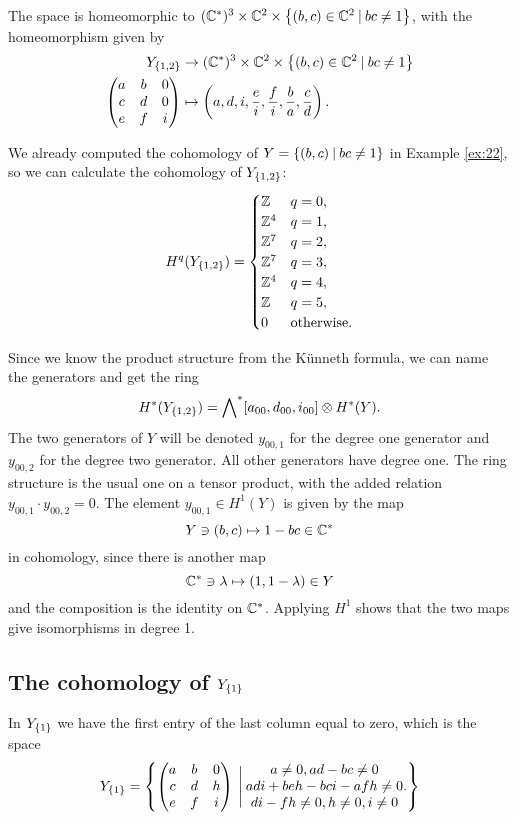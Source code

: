 The space is homeomorphic to $(\mathbb{C}^*)^3\times \mathbb{C}^2
\times \left\{ (b,c)\in\mathbb{C}^2 \: \vert \: bc\neq 1 \right\}$, with the
homeomorphism given by
\begin{align*}
  Y_{\left\{ 1,2 \right\}} &\to (\mathbb{C}^*)^3\times \mathbb{C}^2
  \times \left\{ (b,c)\in\mathbb{C}^2 \: \vert \: bc\neq 1 \right\} \\
  \begin{pmatrix}
    a & b & 0 \\
    c & d & 0 \\
    e & f & i
  \end{pmatrix} &\mapsto \left(a,d,i,\frac{e}{i},\frac{f}{i},
    \frac{b}{a}, \frac{c}{d}\right).
\end{align*}

We already computed the cohomology of $Y =\left\{ (b,c)\: \vert\:
  bc\neq 1 \right\}$ in Example \ref{ex:22}, so we can calculate the
cohomology of $Y_{\left\{ 1,2 \right\}}$:
\[ H^q(Y_{\left\{ 1,2 \right\}}) =
\begin{cases}
  \mathbb{Z} & q = 0, \\
  \mathbb{Z}^4 & q = 1, \\
  \mathbb{Z}^7 & q = 2, \\
  \mathbb{Z}^7 & q = 3, \\
  \mathbb{Z}^4 & q = 4, \\
  \mathbb{Z} & q = 5, \\
  0 & \text{otherwise}.
\end{cases} \]

Since we know the product structure from the K\"unneth formula, we can
name the generators and get the ring 
\[ H^*(Y_{\left\{ 1,2 \right\}}) = \bigwedge\nolimits^*[a_{00},d_{00},i_{00}]\otimes
H^*(Y). \]
The two generators of $Y$ will be denoted $y_{00,1}$ for the degree
one generator and $y_{00,2}$ for the degree two generator. All other
generators have degree one. The ring
structure is the usual one on a tensor product, with the added
relation $y_{00,1}\cdot y_{00,2} = 0$. The element $y_{00,1}\in H^1(Y)$
is given by the map
\[ Y\ni (b,c) \mapsto 1-bc\in \mathbb{C}^* \]
in cohomology, since there is another map
\[ \mathbb{C}^* \ni \lambda \mapsto (1,1-\lambda) \in Y \]
and the composition is the identity on $\mathbb{C}^*$. Applying $H^1$ shows
that the two maps give isomorphisms in degree 1.


\subsection{The cohomology of $Y_{\left\{ 1 \right\}}$}

In $Y_{\left\{ 1 \right\}}$ we have the first entry of the last column equal to
zero, which is the space
\[ Y_{\left\{ 1 \right\}} = \left\{ 
  \begin{pmatrix}
    a & b & 0 \\
    c & d & h \\
    e & f & i
  \end{pmatrix} \:\Bigg\vert\:
  \begin{matrix}
    a \neq 0, ad-bc \neq 0 \\
    adi + beh - bci - afh \neq 0 \\
    di -fh \neq 0, h \neq 0, i \neq 0 
  \end{matrix}.
 \right\} \]

